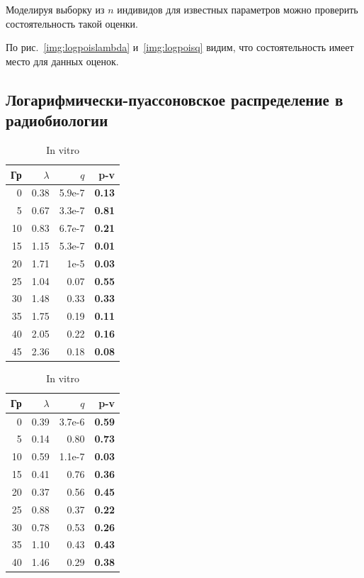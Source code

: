 \documentclass[12pt, specialist, subf, substylefile = spbu_report.rtx]{disser}
\begin{document}
	Моделируя выборку из $n$ индивидов для известных параметров можно проверить состоятельность такой оценки.

	По рис.~\ref{img:logpoislambda} и~\ref{img:logpoisq} видим, что состоятельность имеет место для данных оценок.
	
	\subsection{Логарифмически-пуассоновское распределение в радиобиологии}
	
	\begin{table}[ht]
		\centering
		\caption*{Оценки параметров и значимости критерия хи-квадрат по данным in vivo и in vitro для логарифмически-пуассоновского распределения.}
		\begin{minipage}{0.4\textwidth}
			\centering
			\caption{In vivo}
			
			\begin{tabular}{rrrr}
				\hline
				Гр & $\lambda$ & $q$ & \textbf{p-v} \\ 
				\hline
				0 & 0.38 & 5.9e-7 & \textbf{0.13} \\ 
				5 & 0.67 & 3.3e-7 & \textbf{0.81} \\ 
				10 & 0.83 & 6.7e-7 & \textbf{0.21} \\ 
				15 & 1.15 & 5.3e-7 & \textbf{0.01} \\ 
				20 & 1.71 & 1e-5 & \textbf{0.03} \\ 
				25 & 1.04 & 0.07 & \textbf{0.55} \\ 
				30 & 1.48 & 0.33 & \textbf{0.33} \\ 
				35 & 1.75 & 0.19 & \textbf{0.11} \\ 
				40 & 2.05 & 0.22 & \textbf{0.16} \\
				45 & 2.36 & 0.18 & \textbf{0.08} \\ 
				\hline
			\end{tabular}
			\label{tab:logpoisvivo}
		\end{minipage}
		\begin{minipage}{0.4\textwidth}
			\centering
			\caption{In vitro}
			
			\begin{tabular}{rrrr}
				\hline
				Гр & $\lambda$ & $q$ & \textbf{p-v} \\ 
				\hline
				0 & 0.39 & 3.7e-6 & \textbf{0.59} \\ 
				5 & 0.14 & 0.80 & \textbf{0.73} \\ 
				10 & 0.59 & 1.1e-7 & \textbf{0.03} \\ 
				15 & 0.41 & 0.76 & \textbf{0.36} \\ 
				20 & 0.37 & 0.56 & \textbf{0.45} \\ 
				25 & 0.88 & 0.37 & \textbf{0.22} \\ 
				30 & 0.78 & 0.53 & \textbf{0.26} \\ 
				35 & 1.10 & 0.43 & \textbf{0.43} \\ 
				40 & 1.46 & 0.29 & \textbf{0.38} \\ 
				\hline
			\end{tabular}
			\label{tab:logpoisvitro}
		\end{minipage}
	\end{table}
	
\end{document}
